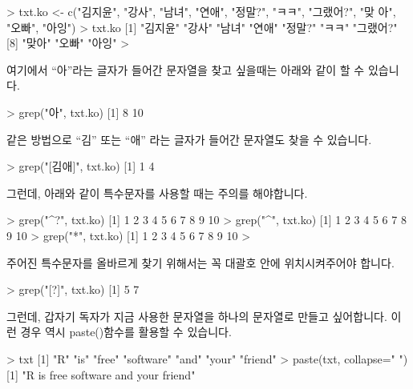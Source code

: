 \documentclass[tutorial.tex]{subfiles}
\begin{document}
\begin{Schunk}
\begin{Soutput} 
> txt.ko <- c("김지윤", "강사", "남녀", "연애", "정말?", "ㅋㅋ", "그랬어?", "맞 아", "오빠", "아잉")
> txt.ko
 [1] "김지윤"  "강사"    "남녀"    "연애"    "정말?"   "ㅋㅋ"    "그랬어?"
 [8] "맞아"    "오빠"    "아잉"   
> 
\end{Soutput}
\end{Schunk}

여기에서 ``아''라는 글자가 들어간 문자열을 찾고 싶을때는 아래와 같이 할 수 있습니다. 

\begin{Schunk}
\begin{Soutput} 
> grep("아", txt.ko)
[1]  8 10
\end{Soutput}
\end{Schunk}

같은 방법으로  ``김'' 또는 ``애'' 라는 글자가 들어간 문자열도 찾을 수 있습니다. 

\begin{Schunk}
\begin{Soutput} 
> grep("[김애]", txt.ko)
[1] 1 4
\end{Soutput}
\end{Schunk}

그런데, 아래와 같이 특수문자를 사용할 때는 주의를 해야합니다. 

\begin{Schunk}
\begin{Soutput} 
> grep("^?", txt.ko)
 [1]  1  2  3  4  5  6  7  8  9 10
> grep("^", txt.ko)
 [1]  1  2  3  4  5  6  7  8  9 10
> grep("*", txt.ko)
 [1]  1  2  3  4  5  6  7  8  9 10
> 
\end{Soutput}
\end{Schunk}

주어진 특수문자를 올바르게 찾기 위해서는 꼭 대괄호 안에 위치시켜주어야 합니다. 

\begin{Schunk}
\begin{Soutput} 
> grep("[?]", txt.ko)
[1] 5 7
\end{Soutput}
\end{Schunk}

그런데, 갑자기 독자가 지금 사용한 문자열을 하나의 문자열로 만들고 싶어합니다.
이런 경우 역시 paste()함수를 활용할 수 있습니다.

\begin{Schunk}
\begin{Soutput} 
> txt
[1] "R"        "is"       "free"     "software" "and"      "your"     "friend"  
> paste(txt, collapse=" ")
[1] "R is free software and your friend"
\end{Soutput}
\end{Schunk}
\end{document}
